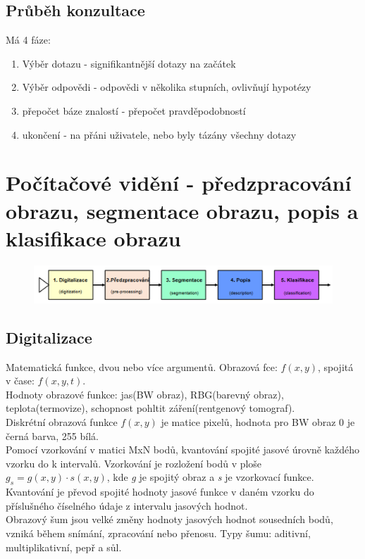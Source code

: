 \subsection{Průběh konzultace}
Má 4 fáze:
\begin{enumerate}
    \item Výběr dotazu - signifikantnější dotazy na začátek
    \item Výběr odpovědi - odpovědi v několika stupních, ovlivňují hypotézy
    \item přepočet báze znalostí - přepočet pravděpodobností
    \item ukončení - na přáni uživatele, nebo byly tázány všechny dotazy
\end{enumerate}

\section{Počítačové vidění - předzpracování obrazu, segmentace obrazu, popis a klasifikace obrazu}
\begin{figure}[H]
    \includegraphics[scale = 0.4]{images/pc_videni.png}
\end{figure}
\subsection{Digitalizace}
Matematická funkce, dvou nebo více argumentů. Obrazová fce: \(f(x,y)\), spojitá v čase: \(f(x,y,t)\).\\
Hodnoty obrazové funkce: jas(BW obraz), RBG(barevný obraz), teplota(termovize), schopnost pohltit záření(rentgenový tomograf).\\
Diskrétní obrazová funkce \(f(x,y)\) je matice pixelů, hodnota pro BW obraz 0 je černá barva, 255 bílá.\\
Pomocí vzorkování v matici MxN bodů, kvantování spojité jasové úrovně každého vzorku do k intervalů. Vzorkování je rozložení bodů v ploše \(g_s = g(x,y)\cdot s(x,y)\), kde \textit{g} je spojitý obraz a \textit{s} je vzorkovací funkce. Kvantování je převod spojité hodnoty jasové funkce v daném vzorku do příslušného číselného údaje z intervalu jasových hodnot.\\
Obrazový šum jsou velké změny hodnoty jasových hodnot sousedních bodů, vzniká během snímání, zpracování nebo přenosu. Typy šumu: aditivní, multiplikativní, pepř a sůl.\\

